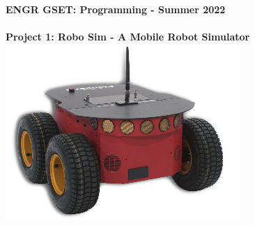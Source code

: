 \documentclass[11pt]{article}
\newcommand{\secNum}{GSET: Programming}
\newcommand{\assnType}{Project}
\newcommand{\assnTitle}{Robo Sim - A Mobile Robot Simulator}
\newcommand{\assnNum}{1}
\newcommand{\currTerm}{Summer 2022}
\begin{document}
	\textbf{\LARGE ENGR \hspace{2mm}\secNum \hspace{1mm} - \hspace{1mm} \currTerm} \\\\
	\textbf{\LARGE \assnType \hspace{1mm}  \assnNum : \assnTitle}\\

         \includegraphics[scale=0.5]{hw2_fig1.png}
\end{document}
